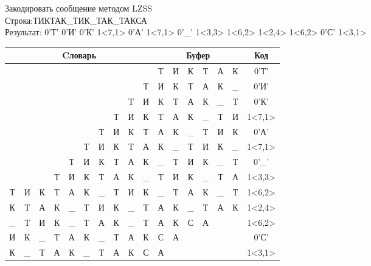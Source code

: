 \documentclass[a4paper, 12pt]{article}
\begin{document}
Закодировать сообщение методом LZSS\\
Строка:ТИКТАК\_ТИК\_ТАК\_ТАКСА\\
Результат: 0'Т' 0'И' 0'К' 1<7,1> 0'А' 1<7,1> 0'\_' 1<3,3> 1<6,2> 1<2,4> 1<6,2> 0'С' 1<3,1>\\
\begin{table}[h!]
\centering
\begin{tabular}{|c|c|c|c|c|c|c|c|c|c|c|c|c|c|c|c|c|}
\hline
\multicolumn{10}{|c|}{Cловарь} & \multicolumn{6}{c|}{Буфер} & Код  \\ \hline
  &   &   &   &   &   &   &   &   &   & Т & И & К & Т & А & К & 0'Т'\\ \hline
  &   &   &   &   &   &   &   &   & Т & И & К & Т & А & К & \_ & 0'И'\\ \hline
  &   &   &   &   &   &   &   & Т & И & К & Т & А & К & \_ & Т & 0'К'\\ \hline
  &   &   &   &   &   &   & \cellcolor[HTML]{FFFF00} Т & И & К & \cellcolor[HTML]{FFFF00} Т & А & К & \_ & Т & И & 1<7,1>\\ \hline
  &   &   &   &   &   & Т & И & К & Т & А & К & \_ & Т & И & К & 0'А'\\ \hline
  &   &   &   &   & Т & И & \cellcolor[HTML]{FFFF00} К & Т & А & \cellcolor[HTML]{FFFF00} К & \_ & Т & И & К & \_ & 1<7,1>\\ \hline
  &   &   &   & Т & И & К & Т & А & К & \_ & Т & И & К & \_ & Т & 0'\_'\\ \hline
  &   &   & \cellcolor[HTML]{FFFF00} Т & \cellcolor[HTML]{FFFF00} И & \cellcolor[HTML]{FFFF00} К & Т & А & К & \_ & \cellcolor[HTML]{FFFF00} Т & \cellcolor[HTML]{FFFF00} И & \cellcolor[HTML]{FFFF00} К & \_ & Т & А & 1<3,3>\\ \hline
Т & И & К & Т & А & К & \cellcolor[HTML]{FFFF00} \_ & \cellcolor[HTML]{FFFF00} Т & И & К & \cellcolor[HTML]{FFFF00} \_ & \cellcolor[HTML]{FFFF00} Т & А & К & \_ & Т & 1<6,2>\\ \hline
К & Т & \cellcolor[HTML]{FFFF00} А & \cellcolor[HTML]{FFFF00} К & \cellcolor[HTML]{FFFF00} \_ & \cellcolor[HTML]{FFFF00} Т & И & К & \_ & Т & \cellcolor[HTML]{FFFF00} А & \cellcolor[HTML]{FFFF00} К & \cellcolor[HTML]{FFFF00} \_ & \cellcolor[HTML]{FFFF00} Т & А & К & 1<2,4>\\ \hline
\_ & Т & И & К & \_ & Т & \cellcolor[HTML]{FFFF00} А & \cellcolor[HTML]{FFFF00} К & \_ & Т & \cellcolor[HTML]{FFFF00} А & \cellcolor[HTML]{FFFF00} К & С & А &   &   & 1<6,2>\\ \hline
И & К & \_ & Т & А & К & \_ & Т & А & К & С & А &   &   &   &   & 0'С'\\ \hline
К & \_ & Т & \cellcolor[HTML]{FFFF00} А & К & \_ & Т & А & К & С & \cellcolor[HTML]{FFFF00} А &   &   &   &   &   & 1<3,1>\\ \hline
\end{tabular}
\end{table}
\end{document}
